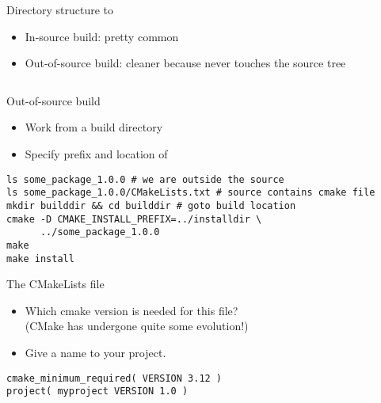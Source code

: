 \begin{numberedframe}{Directory structure}
  \hbox to \textwidth\bgroup
  \begin{minipage}{.45\textwidth}
  \end{minipage}
  \hss
  \begin{minipage}{.45\textwidth}
  \end{minipage}
  \egroup
  \begin{itemize}
  \item In-source build: pretty common
  \item Out-of-source build: cleaner because never touches the source tree
  \end{itemize}
\begin{lstlisting}
\end{lstlisting}
\end{numberedframe}

\begin{numberedframe}{Out-of-source build}
  \begin{itemize}
  \item Work from a build directory
  \item Specify prefix and location of 
  \end{itemize}
\begin{lstlisting}
ls some_package_1.0.0 # we are outside the source
ls some_package_1.0.0/CMakeLists.txt # source contains cmake file
mkdir builddir && cd builddir # goto build location
cmake -D CMAKE_INSTALL_PREFIX=../installdir \
      ../some_package_1.0.0
make
make install
\end{lstlisting}
\end{numberedframe}

\lstset{language=CMake}

\begin{numberedframe}{The CMakeLists file}
  \begin{itemize}
  \item Which cmake version is needed for this file?\\
    (CMake has undergone quite some evolution!)
  \item Give a name to your project.
  \end{itemize}
\begin{lstlisting}
cmake_minimum_required( VERSION 3.12 )
project( myproject VERSION 1.0 )
\end{lstlisting}
\end{numberedframe}

